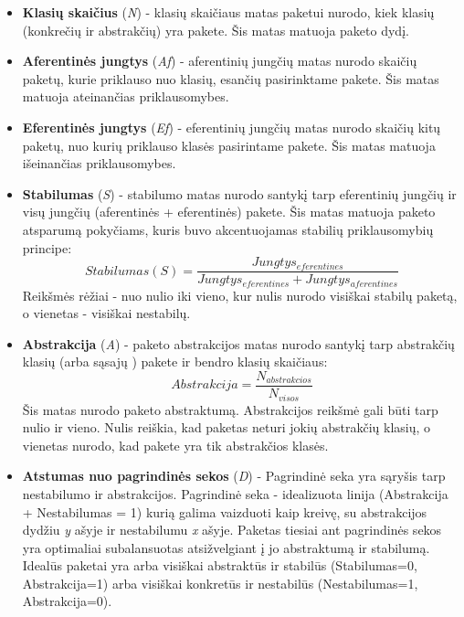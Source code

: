 \begin{itemize}
    \item \textbf{Klasių skaičius} (\textit{N}) - klasių skaičiaus matas paketui nurodo, kiek klasių (konkrečių ir abstrakčių) yra pakete.
    Šis matas matuoja paketo dydį.
    \item \textbf{Aferentinės jungtys } (\textit{Af}) - aferentinių jungčių matas nurodo
    skaičių paketų, kurie priklauso nuo klasių, esančių pasirinktame pakete.
    Šis matas matuoja ateinančias priklausomybes.
    \item \textbf{Eferentinės jungtys } (\textit{Ef}) - eferentinių jungčių matas nurodo skaičių kitų paketų,
    nuo kurių priklauso klasės pasirintame pakete.
    Šis matas matuoja išeinančias priklausomybes.
    \item \textbf{Stabilumas} (\textit{S}) - stabilumo matas nurodo santykį tarp eferentinių jungčių ir
    visų jungčių (aferentinės + eferentinės) pakete.
    Šis matas matuoja paketo atsparumą pokyčiams, kuris buvo akcentuojamas stabilių priklausomybių principe:
    \begin{equation}
        Stabilumas (S) =\frac{Jungtys_{eferentines}}{Jungtys_{eferentines} + Jungtys_{aferentines}}
    \end{equation}
    Reikšmės rėžiai - nuo nulio iki vieno, kur nulis nurodo visiškai stabilų paketą, o vienetas - visiškai nestabilų.
    \item \textbf{Abstrakcija} (\textit{A}) - paketo abstrakcijos matas nurodo santykį tarp abstrakčių klasių (arba sąsajų ) pakete ir bendro klasių skaičiaus:
    \begin{equation}
        Abstrakcija=\frac{N_{abstrakcios}}{N_{visos}}
    \end{equation}
    Šis matas nurodo paketo abstraktumą.
    Abstrakcijos reikšmė gali būti tarp nulio ir vieno.
    Nulis reiškia, kad paketas neturi jokių abstrakčių klasių, o vienetas nurodo, kad pakete yra tik abstrakčios klasės.
    \item \textbf{Atstumas nuo pagrindinės sekos} (\textit{D}) -
    Pagrindinė seka yra sąryšis tarp nestabilumo ir abstrakcijos.
    Pagrindinė seka - idealizuota linija (Abstrakcija + Nestabilumas = 1)  kurią galima vaizduoti kaip kreivę, su abstrakcijos dydžiu \textit{y} ašyje ir nestabilumu \textit{x} ašyje.
    Paketas tiesiai ant pagrindinės sekos yra optimaliai subalansuotas atsižvelgiant į jo abstraktumą ir stabilumą.
    Idealūs paketai yra arba visiškai abstraktūs ir stabilūs (Stabilumas=0, Abstrakcija=1) arba visiškai konkretūs ir nestabilūs (Nestabilumas=1, Abstrakcija=0).

\end{itemize}
